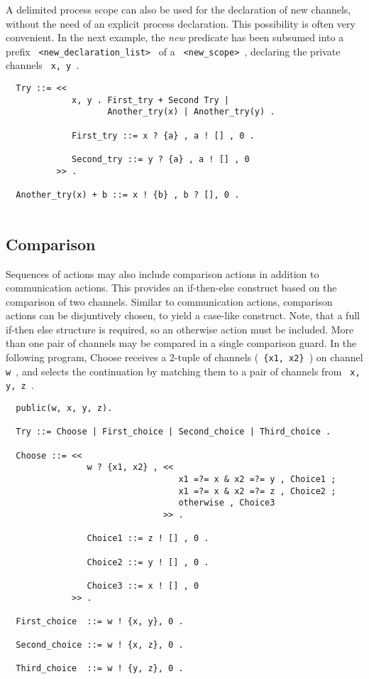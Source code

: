 A delimited process scope can also be used for the declaration of
new channels, without the need of an explicit process declaration.
This possibility is often very convenient. In the next example, the
{\em new} predicate has been subsumed into a prefix
\verb+ <new_declaration_list> +
of a \verb+ <new_scope> +, declaring the private channels \verb+ x, y +.

\begin{verbatim}
  Try ::= <<
             x, y . First_try + Second Try |
                    Another_try(x) | Another_try(y) .

             First_try ::= x ? {a} , a ! [] , 0 .

             Second_try ::= y ? {a} , a ! [] , 0 
          >> .

  Another_try(x) + b ::= x ! {b} , b ? [], 0 .
 
\end{verbatim}

\subsection{Comparison}

Sequences of actions may also include comparison actions in
addition to communication actions. This provides an if-then-else construct
based on the comparison of two channels. Similar to communication
actions, comparison actions can be disjuntively chosen, to yield a
case-like construct. Note, that a full if-then else structure is
required, so an otherwise action must be included. More than one pair
of channels may be compared in a single comparison guard. In the following
program, Choose receives a 2-tuple of channels (\verb+ {x1, x2} +)
on channel \verb+ w +, and selects the continuation by matching them
to a pair of channels from \verb+ x, y, z +.

\begin{verbatim}
  public(w, x, y, z).

  Try ::= Choose | First_choice | Second_choice | Third_choice .

  Choose ::= <<
                w ? {x1, x2} , <<
                                  x1 =?= x & x2 =?= y , Choice1 ;
                                  x1 =?= x & x2 =?= z , Choice2 ;
                                  otherwise , Choice3
                               >> .

                Choice1 ::= z ! [] , 0 .

                Choice2 ::= y ! [] , 0 . 

                Choice3 ::= x ! [] , 0
             >> .
  
  First_choice  ::= w ! {x, y}, 0 .
          
  Second_choice ::= w ! {x, z}, 0 .

  Third_choice  ::= w ! {y, z}, 0 .  
 
\end{verbatim}


